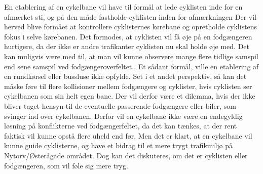 En etablering af en cykelbane vil have til formål at lede cyklisten inde for en afmærket sti, og på den måde fastholde cyklisten inden for afmærkningen Der vil herved blive formået at kontrollere cyklisternes kørebane og opretholde cyklistens fokus i selve kørebanen. Det formodes, at cyklisten vil få øje på en fodgængeren hurtigere, da der ikke er andre trafikanter cyklisten nu skal holde øje med. Det kan muligvis være med til, at man vil kunne observere mange flere tidlige samspil end sene samspil ved fodgængeroverfeltet.. Et sådant formål, ville en etablering af en rundkørsel eller bussluse ikke opfylde. Set i et andet perspektiv, så kan det måske føre til flere kollisioner mellem fodgængere og cyklister, hvis cyklisten ser cykelbanen som sin helt egen bane. Der vil derfor være et dilemma, hvis der ikke bliver taget hensyn til de eventuelle passerende fodgængere eller biler, som svinger ind over cykelbanen. Derfor vil en cykelbane ikke være en endegyldig løsning på konflikterne ved fodgængerfeltet, da det kan tænkes, at der rent faktisk vil kunne opstå flere uheld end før. Men det er klart, at en cykelbane vil kunne guide cyklisterne, og have et bidrag til et mere trygt trafikmiljø på Nytorv/Østerågade området. Dog kan det diskuteres, om det er cyklisten eller fodgængeren, som vil føle sig mere tryg.
